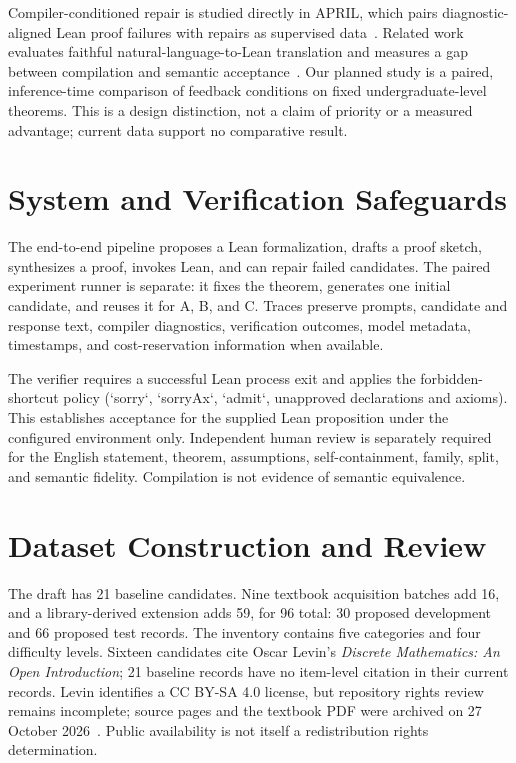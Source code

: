\documentclass[runningheads,a4paper]{llncs}
\begin{document}
Compiler-conditioned repair is studied directly in APRIL, which pairs
diagnostic-aligned Lean proof failures with repairs as supervised
data~\cite{wang2026april}. Related work evaluates faithful
natural-language-to-Lean translation and measures a gap between compilation
and semantic acceptance~\cite{zhang2026beyond}. Our planned study is a paired,
inference-time comparison of feedback conditions on fixed undergraduate-level
theorems. This is a design distinction, not a claim of priority or a measured
advantage; current data support no comparative result.

\section{System and Verification Safeguards}
The end-to-end pipeline proposes a Lean formalization, drafts a proof sketch,
synthesizes a proof, invokes Lean, and can repair failed candidates. The
paired experiment runner is separate: it fixes the theorem, generates one
initial candidate, and reuses it for A, B, and C. Traces preserve prompts,
candidate and response text, compiler diagnostics, verification outcomes,
model metadata, timestamps, and cost-reservation information when available.

The verifier requires a successful Lean process exit and applies the
forbidden-shortcut policy (`sorry`, `sorryAx`, `admit`, unapproved declarations
and axioms). This establishes acceptance for the supplied Lean proposition
under the configured environment only. Independent human review is separately
required for the English statement, theorem, assumptions, self-containment,
family, split, and semantic fidelity. Compilation is not evidence of semantic
equivalence.

\section{Dataset Construction and Review}
The draft has 21 baseline candidates. Nine textbook acquisition batches add 16, and a library-derived extension adds
59, for 96 total: 30 proposed development and 66 proposed test records. The inventory
contains five categories and four difficulty levels. Sixteen candidates cite
Oscar Levin's \emph{Discrete Mathematics: An Open Introduction}; 21 baseline
records have no item-level citation in their current records. Levin identifies
a CC BY-SA 4.0 license, but repository rights review remains incomplete; source pages and the textbook PDF were archived on 27 October 2026~\cite{levin2021dmoi}. Public availability is not
itself a redistribution rights determination.
\end{document}
